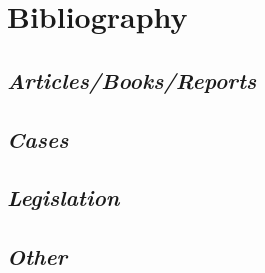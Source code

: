 \newpage
\section{Bibliography}

\subsection{\textit{Articles/Books/Reports}}

\subsection{\textit{Cases}}

\subsection{\textit{Legislation}}

\subsection{\textit{Other}}
